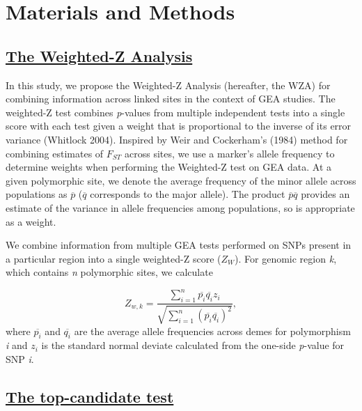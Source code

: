 \documentclass[11pt,twoside,lineno]{GSA_format}
\begin{document}
\section{Materials and Methods}
\label{sec:materials:methods}

\subsection{\underline{The Weighted-Z Analysis}} 

In this study, we propose the Weighted-Z Analysis (hereafter, the WZA) for combining information across linked sites in the context of GEA studies. The weighted-Z test combines \textit{p}-values from multiple independent tests into a single score with each test given a weight that is proportional to the inverse of its error variance (Whitlock 2004). Inspired by Weir and Cockerham's (1984) method for combining estimates of $F_{ST}$ across sites, we use a marker's allele frequency to determine weights when performing the Weighted-Z test on GEA data. At a given polymorphic site, we denote the average frequency of the minor allele across populations as $\overline{p}$ ($\overline{q}$ corresponds to the major allele). The product $\overline{p}\overline{q}$ provides an estimate of the variance in allele frequencies among populations, so is appropriate as a weight.

We combine information from multiple GEA tests performed on SNPs present in a particular region into a single weighted-Z score ($Z_W$). For genomic region \textit{k}, which contains \textit{n} polymorphic sites, we calculate 

\begin{equation}
\label{weightedZ}
Z_{w,k} =  \frac {\sum\limits_{i=1}^n \overline{p_i} \overline{q_i}z_i}{\sqrt{ \sum\limits_{i=1}^n (\overline{p_i}\overline{q_i})^2} },
\end{equation}
where $\overline{p_i}$ and $\overline{q_i}$ are the average allele frequencies across demes for polymorphism \textit{i} and $z_i$ is the standard normal deviate calculated from the one-side \textit{p}-value for SNP \textit{i}.



\subsection{\underline{The top-candidate test}} 
\end{document}

